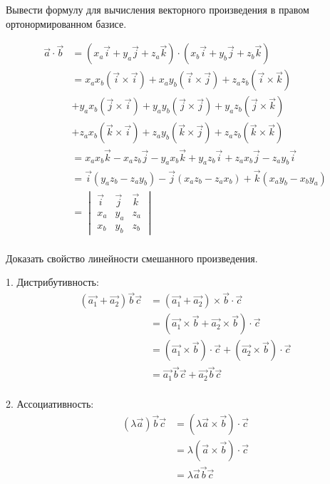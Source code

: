 \begin{question}
  Вывести формулу для вычисления векторного произведения в правом ортонормированном базисе.
\end{question}
\begin{answer}
  \begin{align*}
    \vec{a} \cdot \vec{b} &= \left( x_a \vec{i} + y_a \vec{j} + z_a \vec{k} \right) \cdot \left( x_b \vec{i} + y_b \vec{j} + z_b \vec{k} \right) \\
                          &= x_a x_b (\vec{i} \times \vec{i}) + x_a y_b (\vec{i} \times \vec{j}) + z_a z_b (\vec{i} \times \vec{k}) \\
                          &+ y_a x_b (\vec{j} \times \vec{i}) + y_a y_b (\vec{j} \times \vec{j}) + y_a z_b (\vec{j} \times \vec{k}) \\
                          &+ z_a x_b (\vec{k} \times \vec{i}) + z_a y_b (\vec{k} \times \vec{j}) + z_a z_b (\vec{k} \times \vec{k}) \\
                          &= x_a x_b \vec{k} - x_a z_b \vec{j} - y_a x_b \vec{k} + y_a z_b \vec{i} + z_a x_b \vec{j} - z_a y_b \vec{i} \\
                          &= \vec{i}(y_a z_b - z_a y_b) - \vec{j}(x_a z_b - z_a x_b) + \vec{k}(x_a y_b - x_b y_a) \\
                          &= \begin{vmatrix} 
                            \vec{i} & \vec{j} & \vec{k} \\
                            x_a & y_a & z_a \\
                            x_b & y_b & z_b
                          \end{vmatrix}  \\
  \end{align*}
\end{answer}

\begin{question}
  Доказать свойство линейности смешанного произведения.
\end{question}
\begin{answer}
  1. Дистрибутивность:
  \begin{align*}
    (\vec{a_1} + \vec{a_2}) \vec{b} \vec{c} &= (\vec{a_1} + \vec{a_2}) \times \vec{b} \cdot \vec{c} \\
    &= (\vec{a_1} \times \vec{b} + \vec{a_2} \times \vec{b}) \cdot \vec{c} \\
    &= (\vec{a_1} \times \vec{b}) \cdot \vec{c} + (\vec{a_2} \times \vec{b}) \cdot \vec{c} \\
    &= \vec{a_1} \vec{b} \vec{c} + \vec{a_2} \vec{b} \vec{c} \\
  \end{align*}

  2. Ассоциативность:
  \begin{align*}
    (\lambda \vec{a}) \vec{b} \vec{c} &= (\lambda \vec{a} \times \vec{b}) \cdot \vec{c} \\
    &= \lambda (\vec{a} \times \vec{b}) \cdot \vec{c} \\
    &= \lambda \vec{a} \vec{b} \vec{c} \\
  \end{align*}
\end{answer} 

